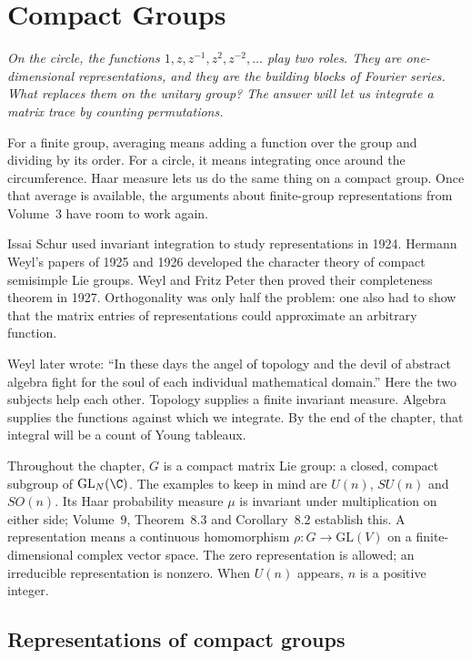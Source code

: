 \chapter{Compact Groups}

\begin{center}\itshape
On the circle, the functions $1,z,z^{-1},z^2,z^{-2},\ldots$ play two roles. They are one-dimensional representations, and they are the building blocks of Fourier series. What replaces them on the unitary group? The answer will let us integrate a matrix trace by counting permutations.
\end{center}

For a finite group, averaging means adding a function over the group and dividing by its order. For a circle, it means integrating once around the circumference. Haar measure lets us do the same thing on a compact group. Once that average is available, the arguments about finite-group representations from Volume~3 have room to work again.

Issai Schur used invariant integration to study representations in 1924. Hermann Weyl's papers of 1925 and 1926 developed the character theory of compact semisimple Lie groups. Weyl and Fritz Peter then proved their completeness theorem in 1927. Orthogonality was only half the problem: one also had to show that the matrix entries of representations could approximate an arbitrary function.

Weyl later wrote: ``In these days the angel of topology and the devil of abstract algebra fight for the soul of each individual mathematical domain.'' Here the two subjects help each other. Topology supplies a finite invariant measure. Algebra supplies the functions against which we integrate. By the end of the chapter, that integral will be a count of Young tableaux.

Throughout the chapter, $G$ is a compact matrix Lie group: a closed, compact subgroup of $\mathrm{GL}_N(\C)$. The examples to keep in mind are $U(n)$, $SU(n)$ and $SO(n)$. Its Haar probability measure $\mu$ is invariant under multiplication on either side; Volume~9, Theorem~8.3 and Corollary~8.2 establish this. A representation means a continuous homomorphism $\rho\colon G\to\mathrm{GL}(V)$ on a finite-dimensional complex vector space. The zero representation is allowed; an irreducible representation is nonzero. When $U(n)$ appears, $n$ is a positive integer.

\section{Representations of compact groups}

